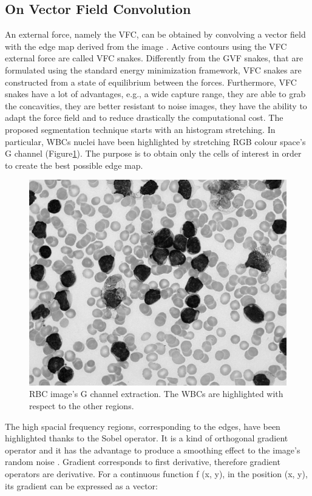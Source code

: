 \documentclass[final,a4paper,12pt,english]{UnicaPhdThesis3}
\begin{document}
\subsection{On Vector Field Convolution}
An external force, namely the VFC, can be obtained by convolving a vector field with the edge map derived from the image \cite{Bing}. 
Active contours using the VFC external force are called VFC snakes. Differently from the GVF \cite{Xu} snakes, that are formulated using the standard energy minimization framework, VFC snakes are constructed from a state of equilibrium between the forces. Furthermore, VFC snakes have a lot of advantages, e.g., a wide capture range, they are able to grab the concavities, they are better resistant to noise images, they have the ability to adapt the force field and to reduce drastically the computational cost.
The proposed segmentation technique starts with an histogram stretching. In particular, WBCs nuclei have been highlighted by stretching RGB colour space's G channel (Figure\ref{fig:GreenComp}).
The purpose is to obtain only the cells of interest in order to create the best possible edge map.

\begin{figure}[!b]
	\centering
	\includegraphics[height=0.25\textheight]{images/2018_1_visapp/GreenComp.png}
	\caption{RBC image's G channel extraction. The WBCs are highlighted with respect to the other regions.}
	\label{fig:GreenComp}
\end{figure}
The high spacial frequency regions, corresponding to the edges, have been highlighted thanks to the Sobel operator. It is a kind of orthogonal gradient operator and it has the advantage to produce a smoothing effect to the image's random noise \cite{Sobel}. Gradient corresponds to first derivative, therefore gradient operators are derivative. For a continuous function f
(x, y), in the position (x, y), its gradient can be expressed as a vector:
\medskip
\end{document}
